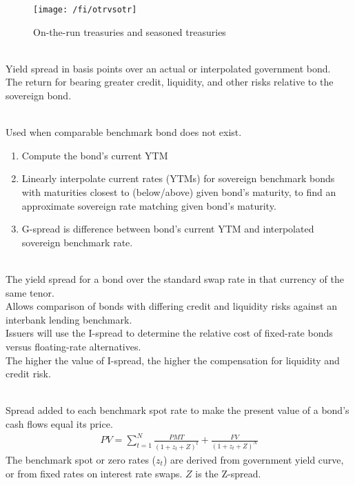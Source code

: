 \begin{figure}[H]
\centering
\texttt{[image: /fi/otrvsotr]}
\caption{On-the-run treasuries and seasoned treasuries}
\end{figure}

\begin{definition} \\
Yield spread in basis points over an actual or interpolated government bond.\\
The return for bearing greater credit, liquidity, and other risks relative to the sovereign bond.
\end{definition}

\begin{method} \\
Used when comparable benchmark bond does not exist.
\begin{enumerate}[label=\roman*.]
\setlength{\itemsep}{0pt}
\item Compute the bond's current YTM
\item Linearly interpolate current rates (YTMs) for sovereign benchmark bonds with maturities closest to (below/above) given bond’s maturity, to find an approximate sovereign rate matching given bond’s maturity.
\item G-spread is difference between bond’s current YTM and interpolated sovereign benchmark rate.
\end{enumerate}
\end{method}

\begin{definition}
\label{def:ispread}
\\
The yield spread for a bond over the standard swap rate in that currency of the same tenor.\\
Allows comparison of bonds with differing credit and liquidity risks against an interbank lending benchmark.\\
Issuers will use the I-spread to determine the relative cost of fixed-rate bonds versus floating-rate alternatives.\\
The higher the value of I-spread, the higher the compensation for liquidity and credit risk.
\end{definition}

\begin{definition} 
\label{def:zpsread}
\\
Spread added to each benchmark spot rate to make the present value of a bond’s cash flows equal its price.
\begin{align}
PV = \sum\limits_{t=1}^N \frac{PMT}{(1 + z_t + Z)^t} + \frac{FV}{(1 + z_t + Z)^N} \nonumber
\end{align}
The benchmark spot or zero rates ($z_t$) are derived from government yield curve, or from fixed rates on interest rate swaps. $Z$ is the Z-spread.
\end{definition}

